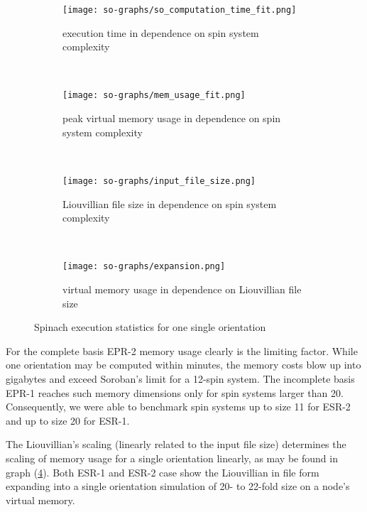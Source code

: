 \documentclass[11.5pt,a4paper]{article}
\begin{document}
\begin{figure}
        \begin{subfigure}[b]{0.45\textwidth}
                \centering
                \texttt{[image: so-graphs/so\_computation\_time\_fit.png]}
                \caption{execution time in dependence on spin system complexity}
                \label{fig-so-runtime}
        \end{subfigure}
        ~ 
        \begin{subfigure}[b]{0.45\textwidth}
                \centering
                \texttt{[image: so-graphs/mem\_usage\_fit.png]}
                \caption{peak virtual memory usage in dependence on spin system complexity}
                \label{fig-so-memory}
        \end{subfigure}
        \\
        \begin{subfigure}[b]{0.45\textwidth}
                \centering
                \texttt{[image: so-graphs/input\_file\_size.png]}
                \caption{Liouvillian file size in dependence on spin system complexity}
                \label{fig-so-file-size}
        \end{subfigure}
	~ 
	\begin{subfigure}[b]{0.45\textwidth}
                \centering
                \texttt{[image: so-graphs/expansion.png]}
                \caption{virtual memory usage in dependence on Liouvillian file size}
                \label{fig-so-expansion}
        \end{subfigure}
        \caption{Spinach execution statistics for one single orientation}
	\label{fig-so-stats}
\end{figure}

For the complete basis EPR-2 memory usage clearly is the limiting factor. While one orientation may be computed within minutes, the memory costs blow up into gigabytes and exceed Soroban's limit for a 12-spin system. The incomplete basis EPR-1 reaches such memory dimensions only for spin systems larger than 20. Consequently, we were able to benchmark spin systems up to size 11 for ESR-2 and up to size 20 for ESR-1. 

The Liouvillian's scaling (linearly related to the input file size) determines the scaling of memory usage for a single orientation linearly, as may be found in graph (\ref{fig-so-expansion}). Both ESR-1 and ESR-2 case show the Liouvillian in file form expanding into a single orientation simulation of 20- to 22-fold size on a node's virtual memory.
\end{document}

